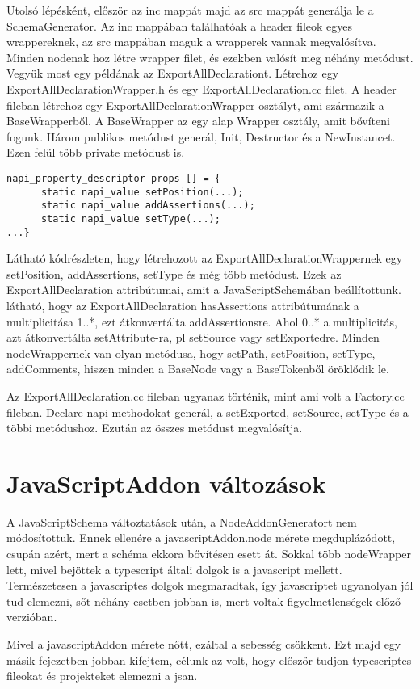 Utolsó lépésként, először az inc mappát majd az src mappát generálja le a SchemaGenerator.
Az inc mappában találhatóak a header fileok egyes wrappereknek, az src mappában maguk a wrapperek vannak megvalósítva.
Minden nodenak hoz létre wrapper filet, és ezekben valósít meg néhány metódust.
Vegyük most egy példának az ExportAllDeclarationt. Létrehoz egy ExportAllDeclarationWrapper.h és egy ExportAllDeclaration.cc filet.
A header fileban létrehoz egy ExportAllDeclarationWrapper osztályt, ami származik a BaseWrapperből. A BaseWrapper az egy alap Wrapper osztály, amit bővíteni fogunk.
Három publikos metódust generál, Init, Destructor és a NewInstancet.
Ezen felül több private metódust is.
\begin{lstlisting}[caption={ExportAllDeclaration.h file}, label={lst:ExportAllDeclaration_header}, language={CStyle}]
napi_property_descriptor props [] = {
      static napi_value setPosition(...);
      static napi_value addAssertions(...);
      static napi_value setType(...);
...}
\end{lstlisting}

Látható  kódrészleten, hogy létrehozott az ExportAllDeclarationWrappernek egy setPosition, addAssertions, setType és még több metódust.
Ezek az ExportAllDeclaration attribútumai, amit a JavaScriptSchemában beállítottunk.
 látható, hogy az ExportAllDeclaration hasAssertions attribútumának a multiplicitása 1..*, ezt átkonvertálta addAssertionsre.
Ahol 0..* a multiplicitás, azt átkonvertálta setAttribute-ra, pl setSource vagy setExportedre.
Minden nodeWrappernek van olyan metódusa, hogy setPath, setPosition, setType, addComments, hiszen minden a BaseNode vagy a BaseTokenből öröklődik le.

\noindent

Az ExportAllDeclaration.cc fileban ugyanaz történik, mint ami volt a Factory.cc fileban. Declare napi methodokat generál, a setExported, setSource, setType és a többi metódushoz.
Ezután az összes metódust megvalósítja.

\section{JavaScriptAddon változások}

\noindent

A JavaScriptSchema változtatások után, a NodeAddonGeneratort nem módosítottuk.
Ennek ellenére a javascriptAddon.node mérete megduplázódott, csupán azért, mert a schéma ekkora bővítésen esett át.
Sokkal több nodeWrapper lett, mivel bejöttek a typescript általi dolgok is a javascript mellett.
Természetesen a javascriptes dolgok megmaradtak, így javascriptet ugyanolyan jól tud elemezni, sőt néhány esetben jobban is, mert voltak figyelmetlenségek előző verzióban.

\noindent

Mivel a javascriptAddon mérete nőtt, ezáltal a sebesség csökkent.
Ezt majd egy másik fejezetben jobban kifejtem, célunk az volt, hogy először tudjon typescriptes fileokat és projekteket elemezni a jsan.
